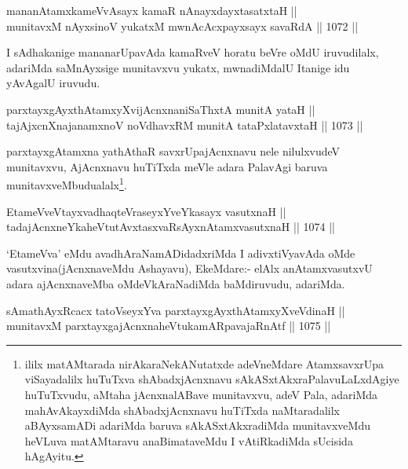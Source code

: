 \begin{shl}
mananAtamxkameVvAsayx kamaR nAnayxdayxtasatxtaH || \\
munitavxM nAyxsinoV yukatxM mwnAcAcxpayxsayx savaRdA ||  1072 ||  
\end{shl}

\begin{artha}
I sAdhakanige mananarUpavAda kamaRveV horatu beVre oMdU iruvudilalx, adariMda saMnAyxsige munitavxvu yukatx, mwnadiMdalU Itanige idu yAvAgalU iruvudu.
\end{artha}


\begin{shl}
parxtayxgAyxthAtamxyXvijAcnxnaniSaThxtA munitA yataH || \\
tajAjxcnXnajanamxnoV noVdhavxRM munitA tataPxlatavxtaH ||  1073 ||  
\end{shl}

\begin{artha}
parxtayxgAtamxna yathAthaR savxrUpajAcnxnavu nele nilulxvudeV munitavxvu, AjAcnxnavu huTiTxda meVle adara PalavAgi baruva munitavxveMbudualalx\footnote{ililx matAMtarada nirAkaraNekANutatxde adeVneMdare AtamxsavxrUpa viSayadalilx huTuTxva shAbadxjAcnxnavu sAkASxtAkxraPalavuLaLxdAgiye huTuTxvudu, aMtaha jAcnxnalABave munitavxvu, adeV Pala, adariMda mahAvAkayxdiMda shAbadxjAcnxnavu huTiTxda naMtaradalilx aBAyxsamADi adariMda baruva sAkASxtAkxradiMda munitavxveMdu heVLuva matAMtaravu anaBimataveMdu I vAtiRkadiMda sUcisida hAgAyitu.}.
\end{artha}

\begin{shl}
EtameVveVtayxvadhaqteVraseyxYveYkasayx vasutxnaH || \\
tadajAcnxneYkaheVtutAvxtasxvaRsAyxnAtamxvasutxnaH ||  1074 ||  
\end{shl}

\begin{artha}
`EtameVva' eMdu avadhAraNamADidadxriMda I adivxtiVyavAda oMde vasutxvina(jAcnxnaveMdu Ashayavu), EkeMdare:- elAlx anAtamxvasutxvU adara ajAcnxnaveMba oMdeVkAraNadiMda baMdiruvudu, adariMda.
\end{artha}

\begin{shl}
sAmathAyxRcacx tatoV\s seyxYva parxtayxgAyxthAtamxyXveVdinaH ||  \\
munitavxM parxtayxgajAcnxnaheVtukamARpavajaRnAtf ||  1075 ||  
\end{shl}

